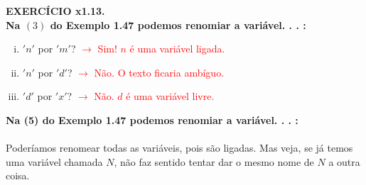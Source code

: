\documentclass[a4paper, 12pt]{article}
\begin{document}
\noindent \textbf{EXERCÍCIO x1.13. \\
Na $(3)$ do Exemplo 1.47 podemos renomiar a variável. . . :}
\begin{enumerate}[(i)]
    \item $'n'$ por $'m'$? \textcolor{red}{$\rightarrow$ Sim! $n$ é uma variável ligada.}
    \item $'n'$ por $'d'$? \textcolor{red}{$\rightarrow$ Não. O texto ficaria ambíguo.}
    \item $'d'$ por $'x'$? \textcolor{red}{$\rightarrow$ Não. $d$ é uma variável livre.}
\end{enumerate}

\noindent \textbf{Na (5) do Exemplo 1.47 podemos renomiar a variável. . . :} \\ \\
Poderíamos renomear todas as variáveis, pois são ligadas. Mas veja, se já temos uma variável chamada $N$, não faz sentido tentar dar o mesmo nome de $N$ a outra coisa.
\end{document}
